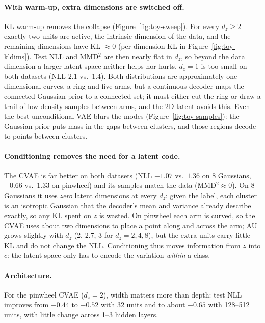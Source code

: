 \documentclass[10pt]{article}
\begin{document}
\paragraph{With warm-up, extra dimensions are switched off.}
KL warm-up removes the collapse (Figure~\ref{fig:toy-sweep}). For every
$d_z\ge2$ exactly two units are active, the intrinsic dimension of the
data, and the remaining dimensions have KL $\approx0$ (per-dimension KL in
Figure~\ref{fig:toy-kldims}). Test NLL and MMD$^2$ are then nearly flat in
$d_z$, so beyond the data dimension a larger latent space neither helps nor
hurts. $d_z=1$ is too small on both datasets (NLL $2.1$ vs.\ $1.4$).
Both distributions are approximately one-dimensional curves, a ring and
five arms, but a continuous decoder maps the connected Gaussian prior to a
connected set; it must either cut the ring or draw a trail of
low-density samples between arms, and the 2D latent avoids this. Even the
best unconditional VAE blurs the modes (Figure~\ref{fig:toy-samples}):
the Gaussian prior puts mass in the gaps between clusters, and those
regions decode to points between clusters.

\paragraph{Conditioning removes the need for a latent code.}
The CVAE is far better on both datasets (NLL $-1.07$ vs.\ $1.36$ on 8
Gaussians, $-0.66$ vs.\ $1.33$ on pinwheel) and its samples match the data
(MMD$^2\approx0$). On 8 Gaussians it uses \emph{zero} latent dimensions at
every $d_z$: given the label, each cluster is an isotropic Gaussian that
the decoder's mean and variance already describe exactly, so any KL spent
on $z$ is wasted. On pinwheel each arm is curved, so the CVAE uses about
two dimensions to place a point along and across the arm; AU grows
slightly with $d_z$ (2, 2.7, 3 for $d_z=2,4,8$), but the extra units carry
little KL and do not change the NLL. Conditioning thus moves information
from $z$ into $c$: the latent space only has to encode the variation
\emph{within} a class.

\paragraph{Architecture.} For the pinwheel CVAE ($d_z=2$), width matters
more than depth: test NLL improves from $-0.44$ to $-0.52$ with 32 units
and to about $-0.65$ with 128--512 units, with little change across 1--3
hidden layers.
\end{document}
